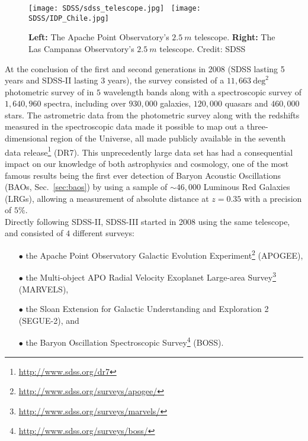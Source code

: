 \begin{figure}
\begin{center}
\texttt{[image: SDSS/sdss\_telescope.jpg]}~%
\texttt{[image: SDSS/IDP\_Chile.jpg]}
\caption{\textbf{Left:} The Apache Point Observatory's $2.5~m$ telescope. \textbf{Right:} The Las Campanas Observatory's $2.5~m$ telescope. Credit: SDSS}
\label{fig:apo_telescope}
\end{center}
\end{figure}


At the conclusion of the first and second generations in 2008 (SDSS lasting 5 years and SDSS-II lasting 3 years), the survey consisted of a $11,663~\mathrm{deg}^2$ photometric survey of in $5$ wavelength bands along with a spectroscopic survey of $1,640,960$ spectra, including over $930,000$ galaxies, $120,000$ quasars and $460,000$ stars. The astrometric data from the
photometric survey along with the redshifts measured in the spectroscopic data made it possible to map out a three-dimensional region of the Universe, all made publicly available in the seventh data release\footnote{\url{http://www.sdss.org/dr7}} (DR7). This unprecedently large data set has had a consequential
impact on our knowledge of both astrophysics and cosmology, one of the most famous results being
the first ever detection of Baryon Acoustic Oscillations (BAOs, Sec.~\ref{sec:baos}) by \cite{Eisenstein2005} using a sample of $\sim 46,000$ Luminous Red Galaxies (LRGs), allowing a measurement of absolute distance at $z=0.35$ with a precision of $5\%$. \\

Directly following SDSS-II, SDSS-III started in 2008 using the same telescope, and consisted of $4$
different surveys: \\
\begin{itemize}
\item[$\bullet$] the Apache Point Observatory Galactic Evolution Experiment\footnote{\url{http://www.sdss.org/surveys/apogee/}} (APOGEE), \\
\item[$\bullet$] the Multi-object APO Radial Velocity Exoplanet Large-area Survey\footnote{\url{http://www.sdss.org/surveys/marvels/}} (MARVELS), \\
\item[$\bullet$] the Sloan Extension for Galactic Understanding and Exploration 2 (SEGUE-2), and \\
\item[$\bullet$] the Baryon Oscillation Spectroscopic Survey\footnote{\url{http://www.sdss.org/surveys/boss/}} (BOSS).\\
\end{itemize}

